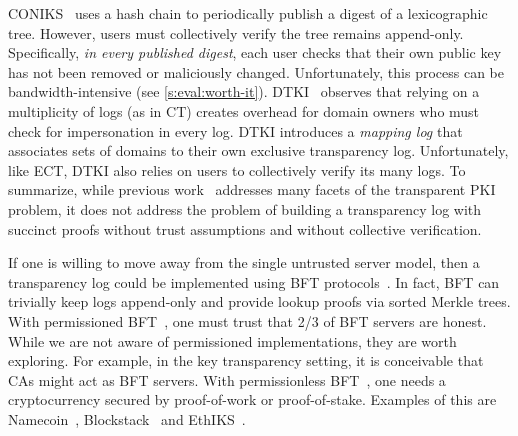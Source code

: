 CONIKS~\cite{coniks} uses a hash chain to periodically publish a digest of a lexicographic tree.
However, users must collectively verify the tree remains append-only.
Specifically, \textit{in every published digest}, each user checks that their own public key has not been removed or maliciously changed.
Unfortunately, this process can be bandwidth-intensive (see \cref{s:eval:worth-it}).
DTKI~\cite{dtki} observes that relying on a multiplicity of logs (as in CT) creates overhead for domain owners who must check for impersonation in every log.
DTKI introduces a \textit{mapping log} that associates sets of domains to their own exclusive transparency log.
Unfortunately, like ECT, DTKI also relies on users to collectively verify its many logs.
To summarize, while previous work~\cite{aki,arpki,policert,dtki} addresses many facets of the transparent PKI problem, it does not address the problem of building a transparency log with succinct proofs without trust assumptions and without collective verification.

If one is willing to move away from the single untrusted server model, then a transparency log could be implemented using BFT protocols~\cite{Lamport1982TheByzantine,pbft,bitcoin}.
In fact, BFT can trivially keep logs append-only and provide lookup proofs via sorted Merkle trees.
With permissioned BFT~\cite{pbft}, one must trust that 2/3 of BFT servers are honest.
While we are not aware of permissioned implementations, they are worth exploring.
For example, in the key transparency setting, it is conceivable that CAs might act as BFT servers.
With permissionless BFT~\cite{bitcoin,ethereum}, one needs a cryptocurrency secured by proof-of-work or proof-of-stake.
Examples of this are Namecoin~\cite{namecoin}, Blockstack~\cite{blockstack} and EthIKS~\cite{ethiks}.

